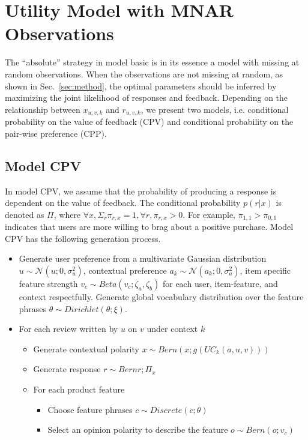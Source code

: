 \documentclass[preprint,12pt]{elsarticle}
\begin{document}
\section{Utility Model with MNAR Observations}\label{sec:mnar}
The ``absolute'' strategy in model basic is in its essence a model with missing at random observations. When the observations are not missing at random, as shown in Sec.~\ref{sec:method},  the optimal parameters should be inferred by maximizing the joint likelihood of responses and feedback. Depending on the relationship between $x_{u,v,k}$ and $r_{u,v,k}$, we present two models, i.e. conditional probability on the value of feedback (CPV) and conditional probability on the pair-wise preference (CPP).

\subsection{Model CPV}
In model CPV, we assume that the probability of producing a response is dependent on the value of feedback. The conditional probability $p(r|x)$ is denoted as $\Pi$, where $\forall x, \Sigma_r \pi_{r,x}=1, \forall r, \pi_{r,x}>0$. For example, $\pi_{1,1}>\pi_{0,1}$ indicates that users are more willing to brag about a positive purchase. Model CPV has the following generation process.
\begin{itemize}
	\item Generate user preference from a multivariate Gaussian distribution $u\sim \mathcal{N}(u;0,\sigma_u^2)$, contextual preference $a_k\sim \mathcal{N}(a_k;0,\sigma_a^2)$, item specific feature strength $v_c \sim Beta(v_c;\zeta_a,\zeta_b)$ for each user, item-feature, and context respectfully. Generate global vocabulary distribution over the feature phrases $\theta\sim Dirichlet(\theta;\xi)$.
	\item For each review written by $u$ on $v$ under context $k$
	\begin{itemize}
	\item Generate contextual polarity $x\sim Bern(x;g(UC_k(a,u,v)))$
	\item Generate response $r \sim Bern{r;\Pi_x}$
	\item For each product feature
	\begin{itemize}
	\item Choose feature phrases $c\sim Discrete(c;\theta)$
	\item Select an opinion polarity to describe the feature $o \sim Bern(o;v_c)$
	\end{itemize}
	\end{itemize}
\end{itemize}
\end{document}
